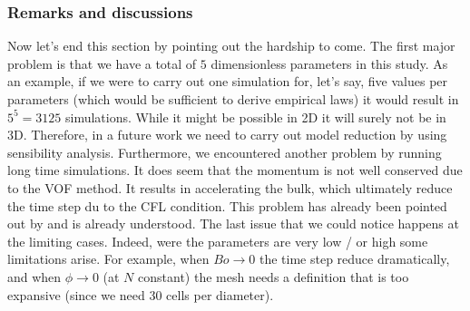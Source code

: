 \subsubsection{Remarks and discussions}
Now let's end this section by pointing out the hardship to come. 
The first major problem is that we have a total of $5$ dimensionless parameters in this study. 
As an example, if we were to carry out one simulation for, let's say, five values per parameters (which would be sufficient to derive empirical laws) it would result in $5^5 = 3125$ simulations. 
While it might be possible in 2D it will surely not be in 3D.
Therefore, in a future work we need to carry out model reduction by using sensibility analysis. 
Furthermore, we encountered another problem by running long time simulations. 
It does seem that the momentum is not well conserved due to the VOF method.
It results in accelerating the bulk, which ultimately reduce the time step du to the CFL condition. 
This problem has already been pointed out by \citet{Naanouh2021numerical} and is already understood. 
The last issue that we could notice happens at the limiting cases. 
Indeed, were the parameters are very low / or high some limitations arise. 
For example, when $Bo \rightarrow 0$ the time step reduce dramatically, and when $\phi \rightarrow 0$ (at $N$ constant) the mesh needs a definition that is too expansive (since we need 30 cells per diameter). 